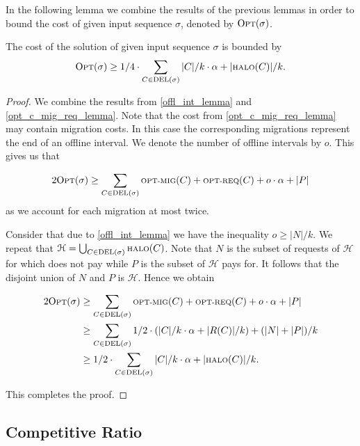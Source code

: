 \documentclass[a4paper,UKenglish,cleveref, autoref, thm-restate,authorcolumns]{../lipics/lipics-v2019}
\newcommand{\optmig}{\text{\scriptsize OPT-MIG}}
\newcommand{\optreq}{\text{\scriptsize OPT-REQ}}
\newcommand{\del}{\text{\scriptsize DEL}}
\newcommand{\opt}{\text{O{\scriptsize PT}}}
\newcommand{\halo}{\text{\scriptsize HALO}}
\begin{document}
In the following lemma we combine the results of the previous lemmas in 
order to bound the cost of \opt{} given input sequence $\sigma$, 
denoted by $\opt(\sigma)$.


\begin{lemma}
	\label{opt_lower_bound}
	The cost of the solution of \opt{} given input sequence $\sigma$ is 
	bounded by
	\begin{align*}
	\opt{}(\sigma)\geq1/4\cdot\sum_{C\in\del{}(\sigma)}|C|/k\cdot\alpha+|\halo(C)|/k.
	\end{align*}
\end{lemma}

\begin{proof}
	We combine the results from \cref{offl_int_lemma} and 
	\cref{opt_c_mig_req_lemma}. Note that the cost from \cref{opt_c_mig_req_lemma} may 
	contain migration costs. In this case the corresponding migrations represent the end 
	of an offline interval. We denote the number of offline intervals by $o$. This gives 
	us that
	
	\begin{align*}
	2\opt{}(\sigma)\geq\sum_{C\in\del(\sigma)}\optmig(C)+\optreq(C)+ o\cdot\alpha+|P|
	\end{align*}
	as we account for each migration at most twice.
	
	Consider that due to \cref{offl_int_lemma} we have the inequality $o\geq|N|/k$. We repeat that $\mathcal{H}=\bigcup_{C\in\del{}(\sigma)}\halo{}(C)$. Note that $N$ is the subset of requests of $\mathcal{H}$ for which \opt{} does not pay while $P$ is the subset of $\mathcal{H}$ \opt{} pays for. It follows that the disjoint union of $N$ and $P$ is $\mathcal{H}$. Hence we obtain
	
	\begin{align*}
	2\opt{}(\sigma)&\geq\sum_{C\in\del(\sigma)}\optmig(C)+\optreq(C)+ o\cdot\alpha+|P|\\
	&\geq\sum_{C\in\del(\sigma)}1/2\cdot(|C|/k\cdot\alpha+|R(C)|/k)+(|N|+|P|)/k\\
	&\geq 1/2\cdot\sum_{C\in\del{}(\sigma)}|C|/k\cdot\alpha+|\halo(C)|/k.
	\end{align*}
	
This completes the proof.
\end{proof}


\subsection{Competitive Ratio}
\end{document}
